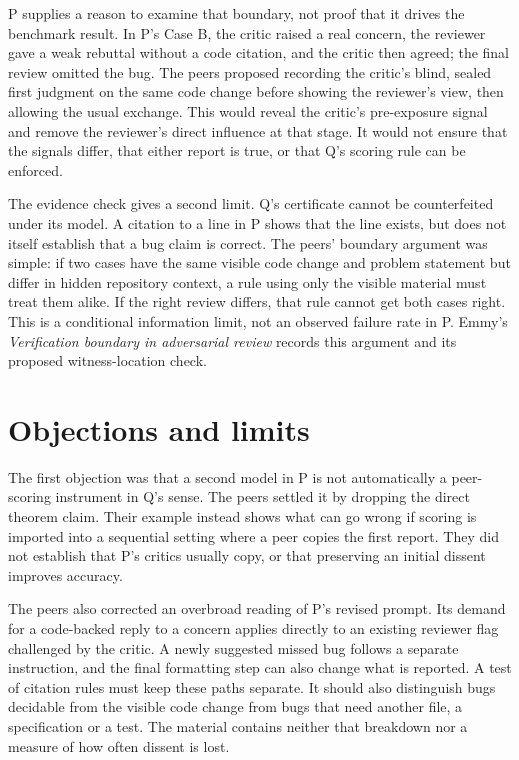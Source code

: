 \documentclass{article}
\begin{document}
P supplies a reason to examine that boundary, not proof that it drives the benchmark result. In P's
Case B, the critic raised a real concern, the reviewer gave a weak rebuttal without a code citation,
and the critic then agreed; the final review omitted the bug. The peers proposed recording the
critic's blind, sealed first judgment on the same code change before showing the reviewer's view,
then allowing the usual exchange. This would reveal the critic's pre-exposure signal and remove the
reviewer's direct influence at that stage. It would not ensure that the signals differ, that either
report is true, or that Q's scoring rule can be enforced.

The evidence check gives a second limit. Q's certificate cannot be counterfeited under its model. A
citation to a line in P shows that the line exists, but does not itself establish that a bug claim
is correct. The peers' boundary argument was simple: if two cases have the same visible code change
and problem statement but differ in hidden repository context, a rule using only the visible
material must treat them alike. If the right review differs, that rule cannot get both cases right.
This is a conditional information limit, not an observed failure rate in P. Emmy's
\emph{Verification boundary in adversarial review} records this argument and its proposed
witness-location check.

\section{Objections and limits}

The first objection was that a second model in P is not automatically a peer-scoring instrument in
Q's sense. The peers settled it by dropping the direct theorem claim. Their example instead shows
what can go wrong if scoring is imported into a sequential setting where a peer copies the first
report. They did not establish that P's critics usually copy, or that preserving an initial dissent
improves accuracy.

The peers also corrected an overbroad reading of P's revised prompt. Its demand for a code-backed
reply to a concern applies directly to an existing reviewer flag challenged by the critic. A newly
suggested missed bug follows a separate instruction, and the final formatting step can also change
what is reported. A test of citation rules must keep these paths separate. It should also
distinguish bugs decidable from the visible code change from bugs that need another file, a
specification or a test. The material contains neither that breakdown nor a measure of how often
dissent is lost.
\end{document}
